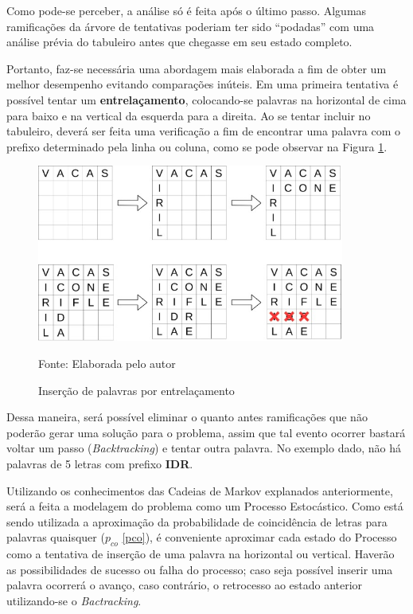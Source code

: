 Como pode-se perceber, a análise só é feita após o último passo. Algumas ramificações da árvore de tentativas poderiam ter sido ``podadas'' com uma análise prévia do tabuleiro antes que chegasse em seu estado completo.   

Portanto, faz-se necessária uma abordagem mais elaborada a fim de obter um melhor desempenho evitando comparações inúteis. Em uma primeira tentativa é possível tentar um \textbf{entrelaçamento}, colocando-se palavras na horizontal de cima para baixo e na vertical da esquerda para a direita. Ao se tentar incluir no tabuleiro, deverá ser feita uma verificação a fim de encontrar uma palavra com o prefixo determinado pela linha ou coluna, como se pode observar na Figura \ref{fig:entrelacamento}. 

\begin{figure}[H] 
\centering
    \caption{Inserção de palavras por entrelaçamento}
    \label{fig:entrelacamento}
    \includegraphics[width=0.9\textwidth]{Figuras/entrelacamento.jpg}
    
    Fonte: Elaborada pelo autor
\end{figure}

Dessa maneira, será possível eliminar o quanto antes ramificações que não poderão gerar uma solução para o problema, assim que tal evento ocorrer bastará voltar um passo (\textit{Backtracking}) e tentar outra palavra. No exemplo dado, não há palavras de 5 letras com prefixo \textbf{IDR}.


Utilizando os conhecimentos das Cadeias de Markov explanados anteriormente, será a feita a modelagem do problema como um Processo Estocástico. Como está sendo utilizada a aproximação da probabilidade de coincidência de letras para palavras quaisquer ($p_{co}$ \ref{pco}), é conveniente aproximar cada estado do Processo como a tentativa de inserção de uma palavra na horizontal ou vertical. Haverão as possibilidades de sucesso ou falha do processo; caso seja possível inserir uma palavra ocorrerá o avanço, caso contrário, o retrocesso ao estado anterior utilizando-se o \textit{Bactracking}. 

